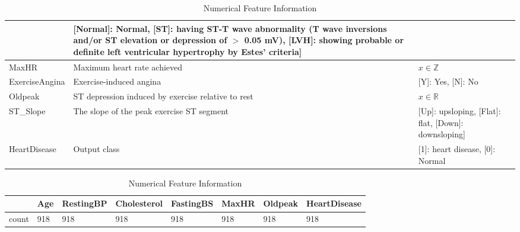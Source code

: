 \documentclass[12pt,conference]{IEEEtran}
\begin{document}
\begin{table}[t]
\begin{tabular}{||>{\centering}m{}>{\centering\arraybackslash}m{}>{\centering\arraybackslash}m{}||}
                &\vspace{.1cm}[Normal]: Normal, [ST]: having ST-T wave abnormality (T wave inversions and/or ST elevation or depression of $>$ 0.05 mV), [LVH]: showing probable or definite left ventricular hypertrophy by Estes' criteria]\vspace{.1cm}\\
\hline
\vspace{.1cm}MaxHR \vspace{.1cm} & Maximum heart rate achieved
                &\vspace{.1cm}$x \in \mathbb{Z}$\vspace{.1cm}\\
\hline
\vspace{.1cm}ExerciseAngina \vspace{.1cm} & Exercise-induced angina
                &\vspace{.1cm}[Y]: Yes, [N]: No\vspace{.1cm}\\
\hline
\vspace{.1cm}Oldpeak \vspace{.1cm} & ST depression induced by exercise relative to rest
                &\vspace{.1cm}$x \in \mathbb{R}$\vspace{.1cm}\\
\hline
\vspace{.1cm}ST\_Slope \vspace{.1cm} & The slope of the peak exercise ST segment
                &\vspace{.1cm}[Up]: upsloping, [Flat]: flat, [Down]: downsloping]\vspace{.1cm}\\
\hline
\vspace{.1cm}HeartDisease \vspace{.1cm} & Output class 
                &\vspace{.1cm}[1]: heart disease, [0]: Normal\vspace{.1cm}\\
\hline
\end{tabular}
\caption{\label{tab:numerical-features}Numerical Feature Information }
    \centering
    \begin{tabular}{|l|l|l|l|l|l|l|l|}
    \hline
        ~ & Age & RestingBP & Cholesterol & FastingBS & MaxHR & Oldpeak & HeartDisease \\ \hline
        count & 918 & 918 & 918 & 918 & 918 & 918 & 918 \\ \hline

\end{tabular}
\end{table}
\end{document}
